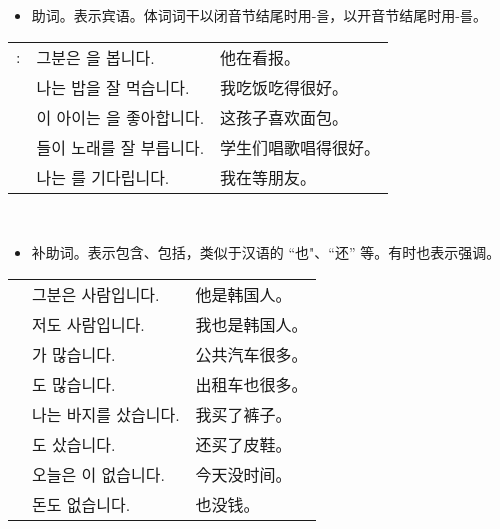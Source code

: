 \begin{grammar}
    \begin{grammarsect}[\kr -을/-를]
    \begin{itemize}
        \item 助词。表示宾语。体词词干以闭音节结尾时用{\kr -을}，以开音节结尾时用{\kr -를}。
    \end{itemize}
    \begin{tabular}{lll}
        \kr \ruby{例}{예}: &\kr 그분은 \ruby{新聞}{신문}을 봅니다.&他在看报。\\
        &\kr 나는 밥을 잘 먹습니다.&我吃饭吃得很好。\\
        &\kr 이 아이는 \ruby{빵}{pão}을 좋아합니다.&这孩子喜欢面包。\\
        &\kr \ruby{學生}{학생}들이 노래를 잘 부릅니다.&学生们唱歌唱得很好。\\
        &\kr 나는 \ruby{親舊}{친구}를 기다립니다.&我在等朋友。
    \end{tabular}\\
    \end{grammarsect}
    \begin{grammarsect}[\kr -도]
        \begin{itemize}
            \item 补助词。表示包含、包括，类似于汉语的 “也"、“还” 等。有时也表示强调。
        \end{itemize}
        \begin{tabular}{lll}
            \kr \ruby{例}{예}&\kr 그분은 \ruby{韓國}{한국} 사람입니다. &他是韩国人。\\ 
            &\kr 저도 \ruby{韓國}{한국} 사람입니다.& 我也是韩国人。 \\
            &\kr \ruby{버스}{bus}가 많습니다.& 公共汽车很多。 \\
            &\kr \ruby{택시}{taxi}도 많습니다.& 出租车也很多。\\
            &\kr 나는 바지를 샀습니다. &我买了裤子。\\
            &\kr \ruby{구두}{くつ}도 샀습니다. &还买了皮鞋。\\
            &\kr 오늘은 \ruby{時間}{시간}이 없습니다. &今天没时间。\\
            &\kr 돈도 없습니다. &也没钱。 
        \end{tabular}\\
    \end{grammarsect}
    \begin{grammarsect}[\kr -고 싶다]
        \begin{itemize}

\end{itemize}
\end{grammarsect}
\end{grammar}
